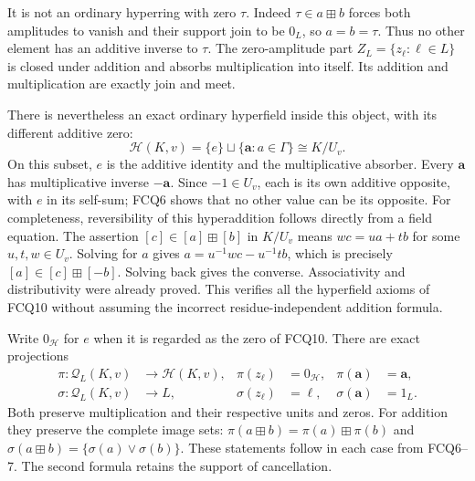 It is not an ordinary hyperring with zero $\tau$. Indeed
$\tau\in a\boxplus b$ forces both amplitudes to vanish and
their support join to be $0_L$, so $a=b=\tau$.
Thus no other element has an additive inverse to $\tau$.
The zero-amplitude part
$Z_L=\{z_\ell:\ell\in L\}$ is closed under addition and
absorbs multiplication into itself. Its addition and
multiplication are exactly join and meet.

There is nevertheless an exact ordinary hyperfield inside
this object, with its different additive zero:
\begin{equation}\tag{FCQ10}
\mathscr H(K,v)=\{e\}\sqcup\{\mathbf a:a\in\Gamma\}
       \cong K/U_v.
\end{equation}
On this subset, $e$ is the additive identity and the
multiplicative absorber. Every $\mathbf a$ has
multiplicative inverse $\mathbf{-a}$. Since $-1\in U_v$,
each is its own additive opposite, with $e$ in its self-sum;
FCQ6 shows that no other value can be its opposite.
For completeness, reversibility of this hyperaddition
follows directly from a field equation. The assertion
$[c]\in[a]\boxplus[b]$ in $K/U_v$ means
$wc=ua+tb$ for some $u,t,w\in U_v$. Solving for $a$ gives
$a=u^{-1}wc-u^{-1}tb$, which is precisely
$[a]\in[c]\boxplus[-b]$. Solving back gives the converse.
Associativity and distributivity were already proved.
This verifies all the hyperfield axioms of FCQ10 without
assuming the incorrect residue-independent addition formula.

Write $0_{\mathscr H}$ for $e$ when it is regarded as the
zero of FCQ10. There are exact projections
\begin{equation}\tag{FCQ11}
\begin{aligned}
\pi:\mathscr Q_L(K,v)&\longrightarrow\mathscr H(K,v),
&\pi(z_\ell)&=0_{\mathscr H},
&\pi(\mathbf a)&=\mathbf a,\\
\sigma:\mathscr Q_L(K,v)&\longrightarrow L,
&\sigma(z_\ell)&=\ell,
&\sigma(\mathbf a)&=1_L .
\end{aligned}
\end{equation}
Both preserve multiplication and their respective units
and zeros. For addition they preserve the complete image
sets:
$\pi(a\boxplus b)=\pi(a)\boxplus\pi(b)$ and
$\sigma(a\boxplus b)=\{\sigma(a)\vee\sigma(b)\}$.
These statements follow in each case from FCQ6--7.
The second formula retains the support of cancellation.

